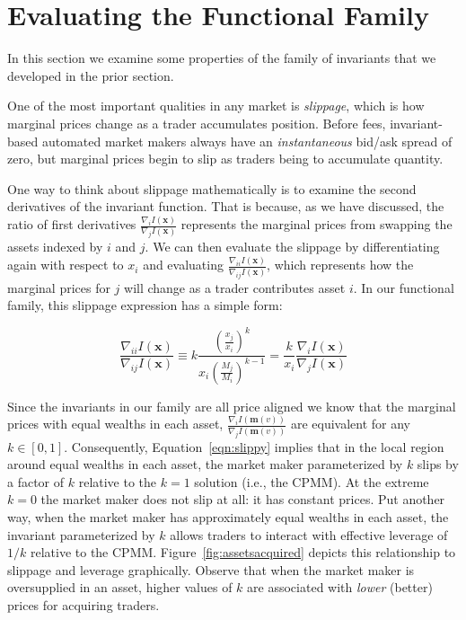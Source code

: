 \documentclass[11pt]{article}
\newcommand{\grad}{\nabla} %
\renewcommand{\vec}[1]{\mathbf{ #1 }}
\begin{document}
\section{Evaluating the Functional Family}

In this section we examine some properties of the family of invariants that we developed in the prior section.

One of the most important qualities in any market is \emph{slippage}, which is how marginal prices change as a trader accumulates position. Before fees, invariant-based automated market makers always have an \emph{instantaneous} bid/ask spread of zero, but marginal prices begin to slip as traders being to accumulate quantity.

One way to think about slippage mathematically is to examine the second derivatives of the invariant function. That is because, as we have discussed, the ratio of first derivatives $ \frac{\grad_i I(\vec{x}) }{\grad_j I(\vec{x})}$  represents the marginal prices from swapping the assets indexed by $i$ and $j$. We can then evaluate the slippage by differentiating again with respect to $x_i$ and evaluating $\frac{\grad_{ii} I(\vec{x}) }{\grad_{ij} I(\vec{x})}$, which represents how the marginal prices for $j$ will change as a trader contributes asset $i$. In our functional family, this slippage expression has a simple form:

\begin{equation}
\frac{\grad_{ii} I(\vec{x}) }{\grad_{ij} I(\vec{x})} \equiv k \frac{\left(\frac{x_j}{x_i}\right)^k}{x_i\left(\frac{M_j}{M_i}\right)^{k-1}} = \frac{k}{x_i} \frac{\grad_i I(\vec{x}) }{\grad_j I(\vec{x})} 
\label{eqn:slippy}
\end{equation}

Since the invariants in our family are all price aligned we know that the marginal prices with equal wealths in each asset, $\frac{\grad_i I(\vec{m}(v)) }{\grad_j I(\vec{m}(v))}$ are equivalent for any $k \in [0,1]$. Consequently, Equation~\ref{eqn:slippy} implies that in the local region around equal wealths in each asset, the market maker parameterized by $k$ slips by a factor of $k$ relative to the $k=1$ solution (i.e., the CPMM). At the extreme $k=0$ the market maker does not slip at all: it has constant prices. Put another way, when the market maker has approximately equal wealths in each asset, the invariant parameterized by $k$ allows traders to interact with effective leverage of $1/k$ relative to the CPMM. Figure~\ref{fig:assetsacquired} depicts this relationship to slippage and leverage graphically. Observe that when the market maker is oversupplied in an asset, higher values of $k$ are associated with \emph{lower} (better) prices for acquiring traders.
\end{document}

